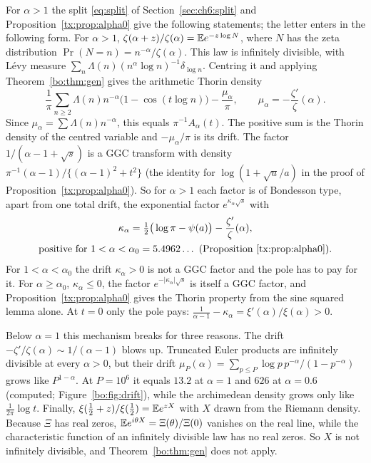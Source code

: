 For $\alpha>1$ the split \eqref{eq:split} of Section~\ref{sec:ch6:split} and Proposition~\ref{tx:prop:alpha0} give the following statements; the letter enters in the following form. For $\alpha>1$, $\zeta(\alpha+z)/\zeta(\alpha)=\mathbb{E} e^{-z\log N}$, where $N$ has the zeta distribution $\Pr(N=n)=n^{-\alpha}/\zeta(\alpha)$. This law is infinitely divisible, with L\'evy measure $\sum_n\Lambda(n)(n^\alpha\log n)^{-1}\delta_{\log n}$. Centring it and applying Theorem~\ref{bo:thm:gen} gives the arithmetic Thorin density
\[
\frac1\pi\sum_{n\ge2}\Lambda(n)n^{-\alpha}\big(1-\cos(t\log n)\big)-\frac{\mu_\alpha}{\pi},\qquad \mu_\alpha=-\frac{\zeta'}{\zeta}(\alpha).
\]
Since $\mu_\alpha=\sum\Lambda(n)n^{-\alpha}$, this equals $\pi^{-1}A_\alpha(t)$. The positive sum is the Thorin density of the centred variable and $-\mu_\alpha/\pi$ is its drift. The factor $1/(\alpha-1+\sqrt s)$ is a GGC transform with density $\pi^{-1}(\alpha-1)/\{(\alpha-1)^2+t^2\}$ (the identity for $\log(1+\sqrt u/a)$ in the proof of Proposition~\ref{tx:prop:alpha0}). So for $\alpha>1$ each factor is of Bondesson type, apart from one total drift, the exponential factor $e^{\kappa_\alpha\sqrt s}$ with
\begin{multline*}
\kappa_\alpha=\tfrac12\big(\log\pi-\psi(a)\big)-\frac{\zeta'}{\zeta}(\alpha),\\ \text{positive for }1<\alpha<\alpha_0=5.4962\ldots\ \text{(Proposition~\ref{tx:prop:alpha0})}.
\end{multline*}
For $1<\alpha<\alpha_0$ the drift $\kappa_\alpha>0$ is not a GGC factor and the pole has to pay for it. For $\alpha\ge\alpha_0$, $\kappa_\alpha\le0$, the factor $e^{-|\kappa_\alpha|\sqrt s}$ is itself a GGC factor, and Proposition~\ref{tx:prop:alpha0} gives the Thorin property from the sine squared lemma alone. At $t=0$ only the pole pays: $\frac1{\alpha-1}-\kappa_\alpha=\xi'(\alpha)/\xi(\alpha)>0$.

Below $\alpha=1$ this mechanism breaks for three reasons. The drift $-\zeta'/\zeta(\alpha)\sim1/(\alpha-1)$ blows up. Truncated Euler products are infinitely divisible at every $\alpha>0$, but their drift $\mu_P(\alpha)=\sum_{p\le P}\log p\,p^{-\alpha}/(1-p^{-\alpha})$ grows like $P^{1-\alpha}$. At $P=10^6$ it equals $13.2$ at $\alpha=1$ and $626$ at $\alpha=0.6$ (computed; Figure~\ref{bo:fig:drift}), while the archimedean density grows only like $\frac{1}{2\pi}\log t$. Finally, $\xi(\frac12+z)/\xi(\frac12)=\mathbb{E} e^{zX}$ with $X$ drawn from the Riemann density. Because $\Xi$ has real zeros, $\mathbb{E} e^{i\theta X}=\Xi(\theta)/\Xi(0)$ vanishes on the real line, while the characteristic function of an infinitely divisible law has no real zeros. So $X$ is not infinitely divisible, and Theorem~\ref{bo:thm:gen} does not apply.

